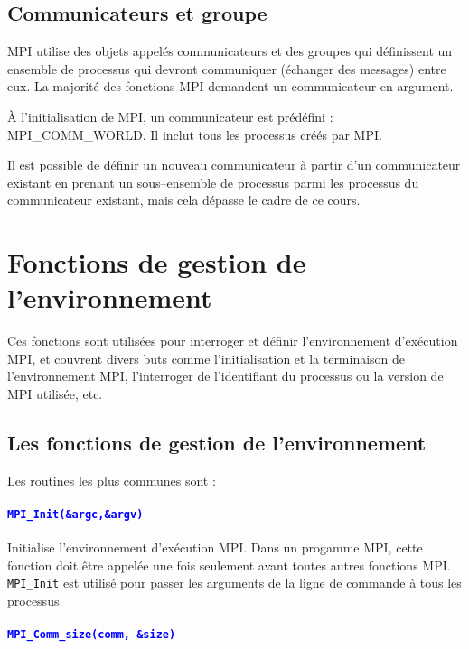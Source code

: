 \documentclass[11pt,a4paper]{article}
\begin{document}
\subsection{Communicateurs et groupe}

MPI utilise des objets appelés communicateurs et des groupes qui définissent un ensemble de processus
qui devront communiquer (échanger des messages) entre eux. La majorité des fonctions MPI demandent un
communicateur en argument.

\`A l'initialisation de MPI, un communicateur  est prédéfini : MPI\_COMM\_WORLD. Il inclut tous les
processus créés par MPI. 

Il est possible de définir un nouveau communicateur à partir d'un communicateur existant 
en prenant un sous--ensemble de processus parmi les processus du communicateur existant, mais cela
dépasse le cadre de ce cours.

\section{Fonctions de gestion de l'environnement}

Ces fonctions sont utilisées pour interroger et définir l'environnement d'exécution MPI, et couvrent divers buts comme
l'initialisation et la terminaison de l'environnement MPI, l'interroger de l'identifiant du processus ou la version de MPI utilisée, etc. 

\subsection{Les fonctions de gestion de l'environnement}

Les routines les plus communes sont :

\paragraph{\textcolor{blue}{\texttt{MPI\_Init(\&argc,\&argv)}}}

  Initialise l'environnement d'exécution MPI. Dans un progamme MPI, cette fonction doit être appelée une fois seulement avant toutes autres fonctions MPI. 
  \texttt{MPI\_Init} est utilisé pour passer les arguments de la ligne de commande à tous les processus.

\paragraph{\textcolor{blue}{\texttt{MPI\_Comm\_size(comm, \&size)}}}
\end{document}
